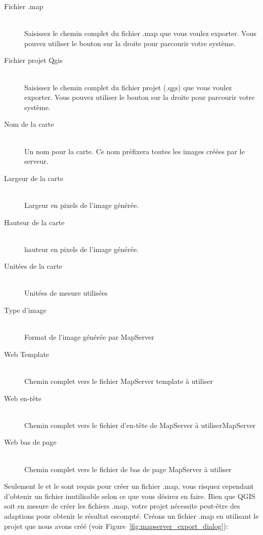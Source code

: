 \begin{description}
\item [Fichier .map] \mbox{}\\
Saisissez le chemin complet du fichier .map que vous voulez exporter. Vous pouvez utiliser le bouton sur la droite pour parcourir votre syst\`eme.
\item [Fichier projet Qgis] \mbox{}\\
Saisissez le chemin complet du fichier projet (.qgs) que vous voulez exporter. Vous pouvez utiliser le bouton sur la droite pour parcourir votre syst\`eme.
\item [Nom de la carte] \mbox{}\\
Un nom pour la carte. Ce nom pr\'efixera toutes les images cr\'e\'ees par le serveur.
\item [Largeur de la carte] \mbox{}\\
Largeur en pixels de l'image g\'en\'er\'ee.
\item [Hauteur de la carte] \mbox{}\\
hauteur en pixels de l'image g\'en\'er\'ee.
\item [Unit\'ees de la carte] \mbox{}\\
Unit\'ees de mesure utilis\'ees
\item [Type d'image] \mbox{}\\
Format de l'image g\'en\'er\'ee par MapServer
\item [Web Template] \mbox{}\\
Chemin complet vers le fichier MapServer template \`a utiliser
\item [Web en-t\^ete] \mbox{}\\
Chemin complet vers le fichier d'en-t\^ete de MapServer \`a utiliserMapServer
\item [Web bas de page] \mbox{}\\
Chemin complet vers le fichier de bas de page MapServer \`a utiliser
\end{description}

Seulement le  et le  sont requis pour cr\'eer un fichier .map, vous risquez cependant d'obtenir un fichier inutilisable selon ce que vous d\'esirez en faire. Bien que QGIS soit en mesure de cr\'eer les fichiers .map, votre projet n\'ecessite peut-\^etre des adaptions pour obtenir le r\'esultat escompt\'e. Cr\'eons un fichier .map en utilisant le projet  que nous avons cr\'e\'e (voir Figure~\ref{fig:mapserver_export_dialog}):


